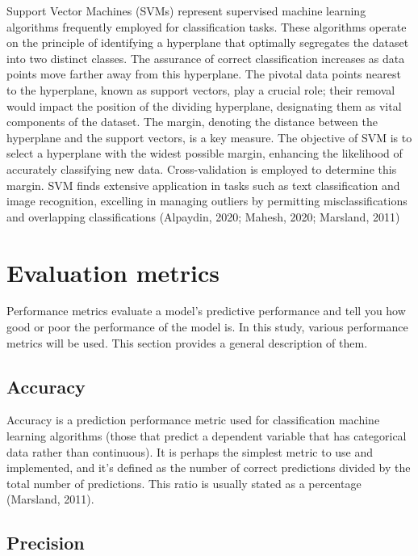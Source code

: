 \documentclass[
  man]{apa7}
\begin{document}
Support Vector Machines (SVMs) represent supervised machine learning algorithms frequently employed for classification tasks.
These algorithms operate on the principle of identifying a hyperplane that optimally segregates the dataset into two distinct classes.
The assurance of correct classification increases as data points move farther away from this hyperplane.
The pivotal data points nearest to the hyperplane, known as support vectors, play a crucial role; their removal would impact the position of the dividing hyperplane, designating them as vital components of the dataset.
The margin, denoting the distance between the hyperplane and the support vectors, is a key measure.
The objective of SVM is to select a hyperplane with the widest possible margin, enhancing the likelihood of accurately classifying new data.
Cross-validation is employed to determine this margin.
SVM finds extensive application in tasks such as text classification and image recognition, excelling in managing outliers by permitting misclassifications and overlapping classifications (Alpaydin, 2020; Mahesh, 2020; Marsland, 2011)

\hypertarget{evaluation-metrics}{%
\section{Evaluation metrics}\label{evaluation-metrics}}

Performance metrics evaluate a model's predictive performance and tell you how good or poor the performance of the model is.
In this study, various performance metrics will be used.
This section provides a general description of them.

\hypertarget{accuracy}{%
\subsection{Accuracy}\label{accuracy}}

Accuracy is a prediction performance metric used for classification machine learning algorithms (those that predict a dependent variable that has categorical data rather than continuous).
It is perhaps the simplest metric to use and implemented, and it's defined as the number of correct predictions divided by the total number of predictions.
This ratio is usually stated as a percentage (Marsland, 2011).

\hypertarget{precision}{%
\subsection{Precision}\label{precision}}
\end{document}

